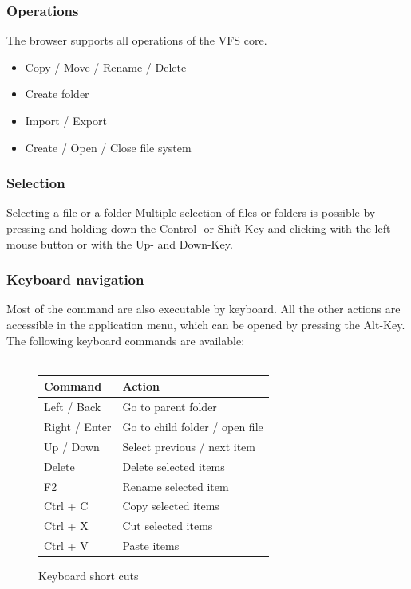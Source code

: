 \documentclass[a4paper,12pt]{article}
\begin{document}
\subsubsection{Operations}
The browser supports all operations of the VFS core.
\begin{itemize}
  \item Copy / Move / Rename / Delete
  \item Create folder
  \item Import / Export
  \item Create / Open / Close file system
\end{itemize}

\subsubsection{Selection}
Selecting a file or a folder 
Multiple selection of files or folders is possible by pressing and holding down the Control- or Shift-Key and clicking with the left mouse button or with the Up- and Down-Key.

\subsubsection{Keyboard navigation}
Most of the command are also executable by keyboard. All the other actions are accessible in the application menu, which can be opened by pressing the Alt-Key.\\
The following keyboard commands are available:\\
\\

\begin{figure}[h!]
	\centering
	\begin{tabular}{| l | l |}
		\hline
		\textbf{Command} & \textbf{Action} \\ \hline \hline
		Left / Back & Go to parent folder \\ \hline
		Right / Enter & Go to child folder / open file \\ \hline
		Up / Down & Select previous / next item \\ \hline
		Delete & Delete selected items \\ \hline
		F2 & Rename selected item \\ \hline
		Ctrl + C & Copy selected items \\ \hline
		Ctrl + X & Cut selected items \\ \hline
		Ctrl + V & Paste items \\ \hline	
	\end{tabular}
	\caption{Keyboard short cuts}
\end{figure}
\end{document}
